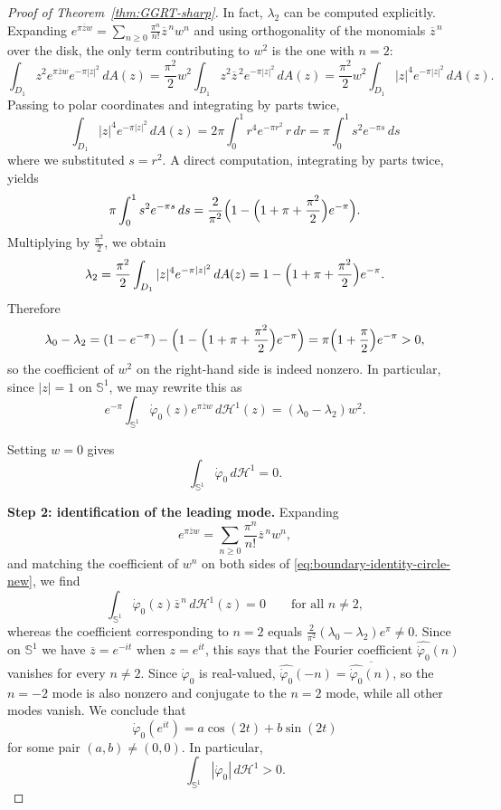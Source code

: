 \documentclass[a4paper,11pt,reqno]{amsart}
\numberwithin{equation}{section}
\theoremstyle{plain} %
\theoremstyle{definition} %
\theoremstyle{remark}
\begin{document}
\begin{proof}[Proof of Theorem~\ref{thm:GGRT-sharp}]
In fact, \(\lambda_2\) can be computed explicitly. Expanding
\(e^{\pi \overline zw}=\sum_{n\geq 0}\frac{\pi^n}{n!}\overline z^{\,n}w^n\)
and using orthogonality of the monomials \(\overline z^{\,n}\) over the disk,
the only term contributing to \(w^2\) is the one with \(n=2\):
\[
\int_{D_1} z^2 e^{\pi \overline zw}e^{-\pi|z|^2}\,dA(z)
=
\frac{\pi^2}{2}w^2\int_{D_1}z^2\overline z^{\,2}e^{-\pi|z|^2}\,dA(z)
=
\frac{\pi^2}{2}w^2\int_{D_1}|z|^4 e^{-\pi|z|^2}\,dA(z).
\]
Passing to polar coordinates and integrating by parts twice,
\[
\int_{D_1}|z|^4 e^{-\pi|z|^2}\,dA(z)
=
2\pi\int_0^1 r^4 e^{-\pi r^2}\,r\,dr
=
\pi\int_0^1 s^2 e^{-\pi s}\,ds
\]
where we substituted \(s=r^2\). A direct computation, integrating by parts
twice, yields
\[
\pi\int_0^1 s^2 e^{-\pi s}\,ds
=
\frac{2}{\pi^2}\Bigl(1-\Bigl(1+\pi+\frac{\pi^2}{2}\Bigr)e^{-\pi}\Bigr).
\]
Multiplying by \(\frac{\pi^2}{2}\), we obtain
\[
\lambda_2
=
\frac{\pi^2}{2}\int_{D_1}|z|^4e^{-\pi|z|^2}\,dA(z)
=
1-\Bigl(1+\pi+\frac{\pi^2}{2}\Bigr)e^{-\pi}.
\]
Therefore
\[
\lambda_0-\lambda_2
=
(1-e^{-\pi})-\Bigl(1-\Bigl(1+\pi+\frac{\pi^2}{2}\Bigr)e^{-\pi}\Bigr)
=
\pi\Bigl(1+\frac{\pi}{2}\Bigr)e^{-\pi}>0,
\]
so the coefficient of \(w^2\) on the right-hand side is indeed nonzero.
In particular, since $|z|=1$ on $\mathbb S^1$, we may rewrite this as
\begin{equation}\label{eq:boundary-identity-circle-new}
e^{-\pi}
\int_{\mathbb S^1}
\dot\varphi_0(z)e^{\pi \overline zw}\,d\mathcal H^1(z)
=
(\lambda_0-\lambda_2)w^2.
\end{equation}

Setting $w=0$ gives
\begin{equation}\label{eq:cancellation-f-0-new}
\int_{\mathbb S^1}\dot\varphi_0\,d\mathcal H^1=0.
\end{equation}

\medskip
\noindent
{\bf Step 2: identification of the leading mode.} Expanding
\[
e^{\pi \overline zw}
=
\sum_{n\geq 0}\frac{\pi^n}{n!}\overline z^{\,n}w^n,
\]
and matching the coefficient of $w^n$ on both sides of
\eqref{eq:boundary-identity-circle-new}, we find
\[
\int_{\mathbb S^1}\dot\varphi_0(z)\overline z^{\,n}\,d\mathcal H^1(z)=0
\qquad \text{for all } n\neq 2,
\]
whereas the coefficient corresponding to $n=2$ equals
$\frac{2}{\pi^2}(\lambda_0-\lambda_2)e^\pi\neq 0$. Since on $\mathbb S^1$
we have $\overline z=e^{-it}$ when $z=e^{it}$, this says that the Fourier
coefficient $\widehat{\dot\varphi_0}(n)$ vanishes for every $n\neq 2$. Since
$\dot\varphi_0$ is real-valued, $\widehat{\dot\varphi_0}(-n)
=\overline{\widehat{\dot\varphi_0}(n)}$, so the $n=-2$ mode is also nonzero
and conjugate to the $n=2$ mode, while all other modes vanish. We conclude
that
\begin{equation}\label{eq:mode-decomposition-new}
\dot\varphi_0(e^{it})
=
a\cos(2t)+b\sin(2t)
\end{equation}
for some pair $(a,b)\neq (0,0)$. In particular,
\begin{equation}\label{eq:l1-nontrivial-new}
\int_{\mathbb S^1} |\dot\varphi_0|\,d\mathcal H^1>0.
\end{equation}


\end{proof}
\end{document}
